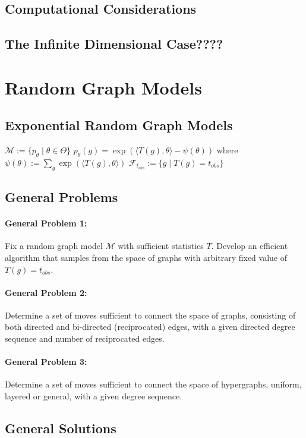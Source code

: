 \documentclass{article}
\theoremstyle{definition}
\begin{document}
\subsection{Computational Considerations}
\subsection{The Infinite Dimensional Case????}

\section{Random Graph Models}
\subsection{Exponential Random Graph Models}
\( \mathcal{M} := \{ p_\theta \mid \theta \in \Theta \} \)
\( p_\theta(g) = \exp(\langle T(g),\theta \rangle - \psi(\theta))\) where \(\psi(\theta) := \sum_{g}\exp(\langle T(g),\theta \rangle)\)
\( \mathcal{F}_{t_{obs}} := \{ g \mid T(g) = t_{obs} \} \)

\subsection{General Problems}

\paragraph{General Problem 1:} Fix a random graph model $\mathcal{M}$ with sufficient statistics $T$. Develop an efficient algorithm that samples from the space of graphs with arbitrary fixed value of $T(g) = t_{obs}$.

\paragraph{General Problem 2:} Determine a set of moves sufficient to connect the space of graphs, consisting of both directed and bi-directed (reciprocated)
edges, with a given directed degree sequence and number of reciprocated edges.

\paragraph{General Problem 3:} Determine a set of moves sufficient to connect the space of hypergraphs, uniform, layered or general, with a given degree sequence.

\subsection{General Solutions}
\end{document}
